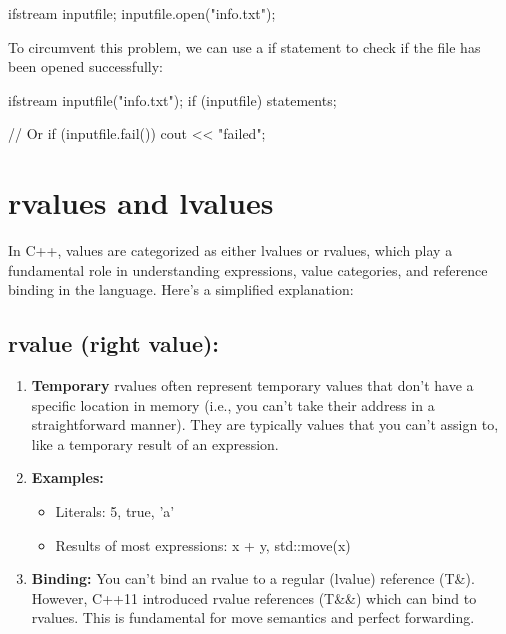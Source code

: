\documentclass{report}
\begin{document}
    \begin{cppcode}
ifstream inputfile;
inputfile.open("info.txt");
    \end{cppcode}
    
    \bigbreak \noindent 
    To circumvent this problem, we can use a if statement to check if the file has been opened successfully:
    \bigbreak \noindent 
    
    \begin{cppcode}
ifstream inputfile("info.txt");
if (inputfile){
    statements;
}

// Or
if (inputfile.fail()) {
    cout << "failed";
}
    \end{cppcode}
    

    \pagebreak \bigbreak \noindent 
    \section{\LARGE rvalues and lvalues}
    \bigbreak \noindent 
    In C++, values are categorized as either lvalues or rvalues, which play a fundamental role in understanding expressions, value categories, and reference binding in the language.
    \bigbreak \noindent 
    Here's a simplified explanation:

    \bigbreak \noindent 
    \subsection{rvalue (right value):}
    \bigbreak \noindent 
    \begin{enumerate}
        \item \textbf{Temporary} rvalues often represent temporary values that don't have a specific location in memory (i.e., you can't take their address in a straightforward manner). They are typically values that you can't assign to, like a temporary result of an expression.
        \item \textbf{Examples:}
        \begin{itemize}
            \item Literals: 5, true, 'a'
            \item Results of most expressions: x + y, std::move(x)
        \end{itemize}
    \item \textbf{Binding:} You can't bind an rvalue to a regular (lvalue) reference (T\&). However, C++11 introduced rvalue references (T\&\&) which can bind to rvalues. This is fundamental for move semantics and perfect forwarding.
    \end{enumerate}
\end{document}
